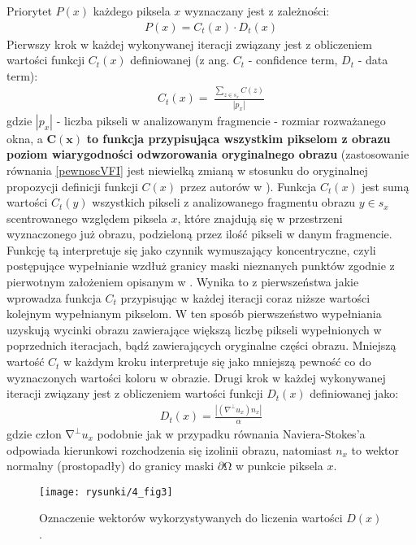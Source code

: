\documentclass[12pt, twoside, openany]{report}
\theoremstyle{definition}
\begin{document}
Priorytet $P \left( x \right)$ każdego piksela $x$ wyznaczany jest z zależności:
\begin{align}
P\left( x \right)=C_t(x)\cdot D_t(x)
\label{PRIORITY}
\end{align}
Pierwszy krok w każdej wykonywanej iteracji związany jest z obliczeniem wartości funkcji $C_t(x)$ definiowanej (z ang. $C_t$ - confidence term, $D_t$ - data term):
\begin{align}
C_t\left( x \right)=\ \frac{\sum_{z \in s_x} {C(z)}}{\left|p_x\right|}
\label{confidenceTerm}
\end{align}
gdzie $\left| p_x\right |$ - liczba pikseli w analizowanym fragmencie - rozmiar rozważanego okna,
a $\mathbf{C(x)}$ \textbf{to funkcja przypisująca wszystkim pikselom z obrazu poziom wiarygodności odwzorowania oryginalnego obrazu}
(zastosowanie równania \eqref{pewnoscVFI} jest niewielką zmianą w stosunku do oryginalnej propozycji definicji funkcji $C(x)$ przez autorów w \cite{criminisi2004region}). Funkcja $C_t(x)$ jest sumą wartości $C_t(y)$ wszystkich pikseli z analizowanego fragmentu obrazu $y \in s_x$ scentrowanego względem piksela $x$, które znajdują się w przestrzeni wyznaczonego już obrazu, podzieloną przez ilość pikseli w danym fragmencie. Funkcję tą interpretuje się jako czynnik wymuszający koncentryczne, czyli postępujące wypełnianie wzdłuż granicy maski nieznanych punktów zgodnie z pierwotnym założeniem opisanym w \cite{efros1999texture}. Wynika to z pierwszeństwa jakie wprowadza funkcja $C_t$ przypisując w każdej iteracji coraz niższe wartości kolejnym wypełnianym pikselom. W ten sposób pierwszeństwo wypełniania uzyskują wycinki obrazu zawierające większą liczbę pikseli wypełnionych w poprzednich iteracjach, bądź zawierających oryginalne części obrazu. Mniejszą wartość $C_t$ w każdym kroku interpretuje się jako mniejszą pewność co do wyznaczonych wartości koloru w obrazie.
Drugi krok w każdej wykonywanej iteracji związany jest z obliczeniem wartości funkcji $D_t(x)$ definiowanej jako:
\begin{align}
D_t(x)= \frac{\left|\left( \nabla^{\bot}u_x \right) n_x\right|}{\alpha }
\label{DataTerm}
\end{align}
gdzie człon ${\mathrm{\nabla }}^{\bot }u_x$ podobnie jak w przypadku równania Naviera-Stokes'a odpowiada kierunkowi rozchodzenia się izolinii obrazu, natomiast  $n_x$ to wektor normalny (prostopadły) do granicy maski $\partial \mathrm{\Omega }$ w punkcie piksela $x$.
\begin{figure}[!h]
	\centering
	\texttt{[image: rysunki/4\_fig3]}
	\caption{Oznaczenie wektorów wykorzystywanych do liczenia wartości $D(x)$.}
	\label{4_fig3} 
\end{figure}
\end{document}
